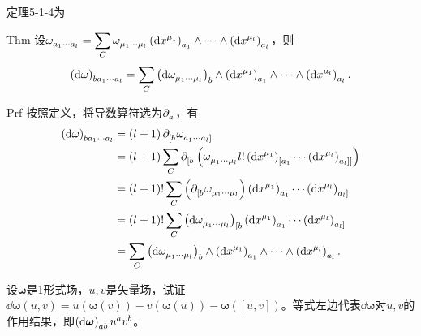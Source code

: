 \begin{xiti}
	\begin{zm}
		定理5-1-4为
		\begin{yl}{Thm}
			设$\displaystyle \tensor{\omega}{_{a_1 \cdots a_l }} = \sum_{C} \tensor{\omega}{_{\mu_1 \cdots \mu_l}} \tensor{\left(\dd{x^{\mu_1}}\right)}{_{a_1}} \wedge \cdots \wedge  \tensor{\left(\dd{x^{\mu_l}}\right)}{_{a_l}} $，则\[ \tensor{\left(\dd{\omega}\right)}{_{b a_1 \cdots a_l}} = \sum_{C} \tensor{\left(\dd{\tensor{\omega}{_{\mu_1 \cdots \mu_l}}}\right)}{_b} \wedge \tensor{\left(\dd{x^{\mu_1}}\right)}{_{a_1}} \wedge \cdots \wedge \tensor{\left(\dd{x^{\mu_l}}\right)}{_{a_l}}. \]
		\end{yl}
	    \begin{yl}{Prf}
	    	按照定义，将导数算符选为$\Partial{a} $，有
	    	\begin{align*}
	    	\tensor{\left(\dd{\omega}\right)}{_{b a_1 \cdots a_l}} &= \left(l+1\right) \Partial{[b} \tensor{\omega}{_{a_1 \cdots a_l]}}\\
	    	&= \left(l+1\right) \sum_{C} \Partial{[b} \left(\tensor{\omega}{_{\mu_1 \cdots \mu_l}} l! \tensor{\left(\dd{x^{\mu_1}}\right)}{_{[a_1}} \cdots   \tensor{\left(\dd{x^{\mu_l}}\right)}{_{a_l]]}}\right) \\
	    	&= \left(l+1\right)! \sum_{C}\left(\Partial{[b} \tensor{\omega}{_{\mu_1 \cdots \mu_l}}\right) \tensor{\left(\dd{x^{\mu_1}}\right)}{_{a_1}} \cdots \tensor{\left(\dd{x^{\mu_l}}\right)}{_{a_l]}}\\
	    	&= \left(l+1\right)! \sum_{C} \tensor{\left( \dd{\tensor{\omega}{_{\mu_1 \cdots \mu_l}}} \right)}{_{[b}}  \tensor{\left(\dd{x^{\mu_1}}\right)}{_{a_1}} \cdots \tensor{\left(\dd{x^{\mu_l}}\right)}{_{a_l]}}\\
	    	&= \sum_{C} \tensor{\left(\dd{\tensor{\omega}{_{\mu_1 \cdots \mu_l}}}\right)}{_b} \wedge \tensor{\left(\dd{x^{\mu_1}}\right)}{_{a_1}} \wedge \cdots \wedge \tensor{\left(\dd{x^{\mu_l}}\right)}{_{a_l}}.
	    	\end{align*}
	    \end{yl}
	\end{zm}
	
	\item 设$\boldsymbol{\omega} $是1形式场，$u,v$是矢量场，试证$\dd{\boldsymbol{\omega}} \left(u,v\right) = u\left(\boldsymbol{\omega}(v)\right) - v\left(\boldsymbol{\omega}(u)\right) - \boldsymbol{\omega}\left([u,v]\right) $。等式左边代表$\dd{\boldsymbol{\omega}}$对$u,v$的作用结果，即$ \tensor{\left( \dd{\boldsymbol{\omega}} \right)}{_a_b} \tensor{u}{^a} \tensor{v}{^b} $。
	

\end{xiti}

